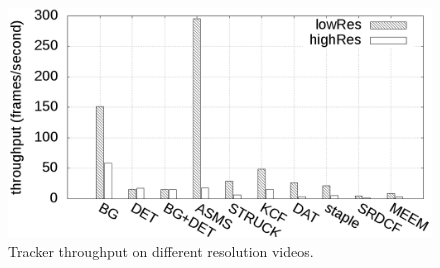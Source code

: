 \begin{figure}
    \centering
    \includegraphics[width=\linewidth]{./img/evaluation/throughputInit_group.png}
   \caption{Tracker throughput on different resolution videos.}
    \label{fig:kf-eval-throughput}
\end{figure}